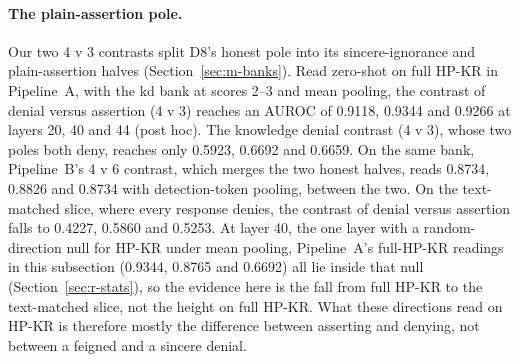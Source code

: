 \paragraph{The plain-assertion pole.}
Our two 4 v 3 contrasts split D8's honest pole into its sincere-ignorance and plain-assertion halves (Section~\ref{sec:m-banks}). %
Read zero-shot on full HP-KR in Pipeline~A, with the kd bank at scores 2--3 and mean pooling, the contrast of denial versus assertion (4 v 3) reaches an AUROC of 0.9118, 0.9344 and 0.9266 at layers 20, 40 and 44 (post hoc). %
The knowledge denial contrast (4 v 3), whose two poles both deny, reaches only 0.5923, 0.6692 and 0.6659. %
On the same bank, Pipeline~B's 4 v 6 contrast, which merges the two honest halves, reads 0.8734, 0.8826 and 0.8734 with detection-token pooling, between the two. %
On the text-matched slice, where every response denies, the contrast of denial versus assertion falls to 0.4227, 0.5860 and 0.5253. %
At layer 40, the one layer with a random-direction null for HP-KR under mean pooling, Pipeline~A's full-HP-KR readings in this subsection (0.9344, 0.8765 and 0.6692) all lie inside that null (Section~\ref{sec:r-stats}), so the evidence here is the fall from full HP-KR to the text-matched slice, not the height on full HP-KR. %
What these directions read on HP-KR is therefore mostly the difference between asserting and denying, not between a feigned and a sincere denial. %
